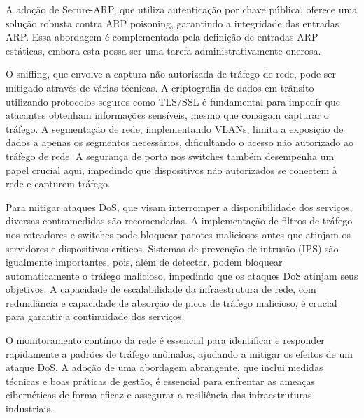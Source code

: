 A adoção de Secure-ARP, que utiliza autenticação por chave pública, oferece uma solução robusta contra ARP poisoning, garantindo a integridade das entradas ARP. Essa abordagem é complementada pela definição de entradas ARP estáticas, embora esta possa ser uma tarefa administrativamente onerosa.

O sniffing, que envolve a captura não autorizada de tráfego de rede, pode ser mitigado através de várias técnicas. A criptografia de dados em trânsito utilizando protocolos seguros como TLS/SSL é fundamental para impedir que atacantes obtenham informações sensíveis, mesmo que consigam capturar o tráfego. A segmentação de rede, implementando VLANs, limita a exposição de dados a apenas os segmentos necessários, dificultando o acesso não autorizado ao tráfego de rede. A segurança de porta nos switches também desempenha um papel crucial aqui, impedindo que dispositivos não autorizados se conectem à rede e capturem tráfego.

Para mitigar ataques DoS, que visam interromper a disponibilidade dos serviços, diversas contramedidas são recomendadas. A implementação de filtros de tráfego nos roteadores e switches pode bloquear pacotes maliciosos antes que atinjam os servidores e dispositivos críticos. Sistemas de prevenção de intrusão (IPS) são igualmente importantes, pois, além de detectar, podem bloquear automaticamente o tráfego malicioso, impedindo que os ataques DoS atinjam seus objetivos. A capacidade de escalabilidade da infraestrutura de rede, com redundância e capacidade de absorção de picos de tráfego malicioso, é crucial para garantir a continuidade dos serviços.

O monitoramento contínuo da rede é essencial para identificar e responder rapidamente a padrões de tráfego anômalos, ajudando a mitigar os efeitos de um ataque DoS. A adoção de uma abordagem abrangente, que inclui medidas técnicas e boas práticas de gestão, é essencial para enfrentar as ameaças cibernéticas de forma eficaz e assegurar a resiliência das infraestruturas industriais.




